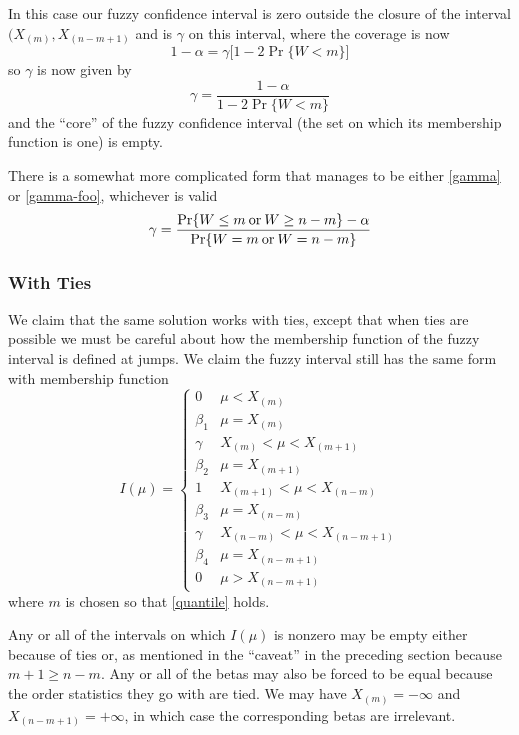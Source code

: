 \documentclass{article}
\newcommand{\opor}{\mathbin{\rm or}}
\begin{document}
In this case our fuzzy confidence interval is zero outside the closure
of the interval $(X_{(m)}, X_{(n - m + 1)}$ and is $\gamma$ on this interval,
where the coverage is now
$$
   1 - \alpha = \gamma  \bigl[ 1 - 2 \Pr \{ W < m \} \bigr]
$$
so $\gamma$ is now given by
\begin{equation} \label{gamma-foo}
   \gamma
   =
   \frac{1 - \alpha}{1 - 2 \Pr \{ W < m \}}
\end{equation}
and the ``core'' of the fuzzy confidence interval (the set on which its
membership function is one) is empty.

There is a somewhat more complicated form that manages to be
either \eqref{gamma} or \eqref{gamma-foo}, whichever is valid
\begin{equation} \label{gamma-cool}
   \gamma
   =
   \frac{\Pr \{ W \le m \opor W \ge n - m \} - \alpha}
   {\Pr \{ W = m \opor W = n - m \}}
\end{equation}

\subsubsection{With Ties}

We claim that the same solution works with ties, except that when ties
are possible
we must be careful about how the membership function of the fuzzy interval
is defined at jumps.  We claim the fuzzy interval still has the same form
with membership function
\begin{equation} \label{non-degenerate}
   I(\mu)
   =
   \begin{cases}
   0 & \mu < X_{(m)}
   \\
   \beta_1 & \mu = X_{(m)}
   \\
   \gamma & X_{(m)} < \mu < X_{(m + 1)}
   \\
   \beta_2 & \mu = X_{(m + 1)}
   \\
   1 & X_{(m + 1)} < \mu < X_{(n - m)}
   \\
   \beta_3 & \mu = X_{(n - m)}
   \\
   \gamma & X_{(n - m)} < \mu < X_{(n - m + 1)}
   \\
   \beta_4 & \mu = X_{(n - m + 1)}
   \\
   0 & \mu > X_{(n - m + 1)}
   \end{cases}
\end{equation}
where $m$ is chosen so that \eqref{quantile} holds.

Any or all of the intervals on which $I(\mu)$ is nonzero may be empty
either because of ties or, as mentioned in the ``caveat'' in the
preceding section because $m + 1 \ge n - m$.
Any or all of the betas may also be forced to be equal because the
order statistics they go with are tied.
We may have $X_{(m)} = - \infty$ and $X_{(n - m + 1)} = + \infty$,
in which case the corresponding betas are irrelevant.
\end{document}
